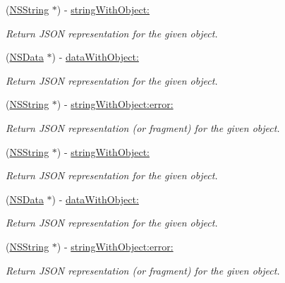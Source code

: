 \begin{DoxyCompactItemize}
(\hyperlink{class_n_s_string}{\-N\-S\-String} $\ast$) -\/ \hyperlink{interface_s_b_json_writer_a98b0a676d8bc77281759765a5cc847fc}{string\-With\-Object\-:}
\begin{DoxyCompactList}\small\item\em \-Return \-J\-S\-O\-N representation for the given object. \end{DoxyCompactList}\item 
(\hyperlink{class_n_s_data}{\-N\-S\-Data} $\ast$) -\/ \hyperlink{interface_s_b_json_writer_a3f1687aa567c4a82cb7233b512d9802b}{data\-With\-Object\-:}
\begin{DoxyCompactList}\small\item\em \-Return \-J\-S\-O\-N representation for the given object. \end{DoxyCompactList}\item 
(\hyperlink{class_n_s_string}{\-N\-S\-String} $\ast$) -\/ \hyperlink{interface_s_b_json_writer_aaf36e759fdf6bfbada41d011ed402245}{string\-With\-Object\-:error\-:}
\begin{DoxyCompactList}\small\item\em \-Return \-J\-S\-O\-N representation (or fragment) for the given object. \end{DoxyCompactList}\item 
(\hyperlink{class_n_s_string}{\-N\-S\-String} $\ast$) -\/ \hyperlink{interface_s_b_json_writer_a98b0a676d8bc77281759765a5cc847fc}{string\-With\-Object\-:}
\begin{DoxyCompactList}\small\item\em \-Return \-J\-S\-O\-N representation for the given object. \end{DoxyCompactList}\item 
(\hyperlink{class_n_s_data}{\-N\-S\-Data} $\ast$) -\/ \hyperlink{interface_s_b_json_writer_a3f1687aa567c4a82cb7233b512d9802b}{data\-With\-Object\-:}
\begin{DoxyCompactList}\small\item\em \-Return \-J\-S\-O\-N representation for the given object. \end{DoxyCompactList}\item 
(\hyperlink{class_n_s_string}{\-N\-S\-String} $\ast$) -\/ \hyperlink{interface_s_b_json_writer_aaf36e759fdf6bfbada41d011ed402245}{string\-With\-Object\-:error\-:}
\begin{DoxyCompactList}\small\item\em \-Return \-J\-S\-O\-N representation (or fragment) for the given object. \end{DoxyCompactList}\item 

\end{DoxyCompactItemize}
